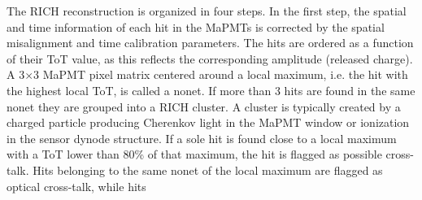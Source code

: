 \documentclass[5p,times,twocolumn]{elsarticle}
\begin{document}
The RICH reconstruction is organized in four steps.
In the first step, the spatial and time information of each hit in the MaPMTs is corrected by the spatial misalignment
and time calibration parameters. The hits are ordered as a function of their ToT value, as this reflects the
corresponding amplitude (released charge). A 3$\times$3 MaPMT pixel matrix centered around a local maximum, i.e.
the hit with the highest local ToT, is called a nonet. If more than 3 hits are found in the same nonet they are grouped
into a RICH cluster. A cluster is typically created by a charged particle producing Cherenkov light in the MaPMT
window or ionization in the sensor dynode structure. 
If a sole hit is found close to a local maximum with a ToT lower than 80\% of that maximum, the hit is flagged as
possible cross-talk. Hits belonging to the same nonet of the local maximum are flagged as optical cross-talk, while hits
\end{document}
